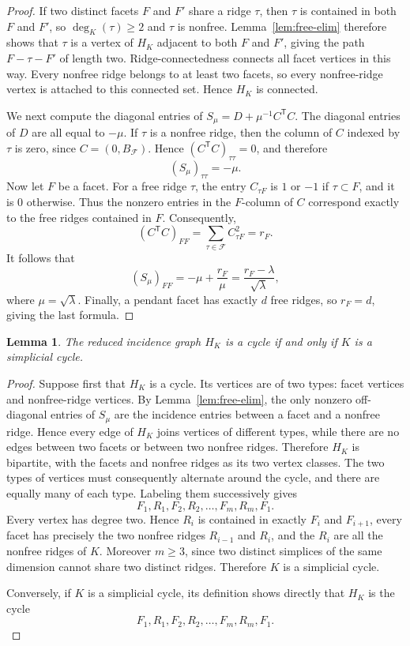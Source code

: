 \documentclass[12pt]{article}
\newtheorem{lemma}{Lemma}
\theoremstyle{remark}
\begin{document}
\begin{proof}
If two distinct facets $F$ and $F'$ share a ridge $\tau$, then $\tau$ is contained in both $F$ and $F'$, so $\deg_K(\tau)\ge2$ and $\tau$ is nonfree.  Lemma~\ref{lem:free-elim} therefore shows that $\tau$ is a vertex of $H_K$ adjacent to both $F$ and $F'$, giving the path $F-\tau-F'$ of length two.  Ridge-connectedness connects all facet vertices in this way.  Every nonfree ridge belongs to at least two facets, so every nonfree-ridge vertex is attached to this connected set.  Hence $H_K$ is connected.

We next compute the diagonal entries of $S_\mu=D+\mu^{-1}C^{\mathsf T}C$.  The diagonal entries of $D$ are all equal to $-\mu$.  If $\tau$ is a nonfree ridge, then the column of $C$ indexed by $\tau$ is zero, since $C=(0,B_{\mathcal F})$.  Hence $(C^{\mathsf T}C)_{\tau\tau}=0$, and therefore
\[
(S_\mu)_{\tau\tau}=-\mu.
\]
Now let $F$ be a facet.  For a free ridge $\tau$, the entry $C_{\tau F}$ is $1$ or $-1$ if $\tau\subset F$, and it is $0$ otherwise.  Thus the nonzero entries in the $F$-column of $C$ correspond exactly to the free ridges contained in $F$.  Consequently,
\[
(C^{\mathsf T}C)_{FF}
=\sum_{\tau\in\mathcal F}C_{\tau F}^2=r_F.
\]
It follows that
\[
(S_\mu)_{FF}=-\mu+\frac{r_F}{\mu}
=\frac{r_F-\lambda}{\sqrt\lambda},
\]
where $\mu=\sqrt\lambda$.  Finally, a pendant facet has exactly $d$ free ridges, so $r_F=d$, giving the last formula.
\end{proof}

\begin{lemma}\label{lem:simplicial-cycle}
The reduced incidence graph $H_K$ is a cycle if and only if $K$ is a simplicial cycle.
\end{lemma}

\begin{proof}
Suppose first that $H_K$ is a cycle.  Its vertices are of two types: facet vertices and nonfree-ridge vertices.  By Lemma~\ref{lem:free-elim}, the only nonzero off-diagonal entries of $S_\mu$ are the incidence entries between a facet and a nonfree ridge.  Hence every edge of $H_K$ joins vertices of different types, while there are no edges between two facets or between two nonfree ridges.  Therefore $H_K$ is bipartite, with the facets and nonfree ridges as its two vertex classes.  The two types of vertices must consequently alternate around the cycle, and there are equally many of each type.  Labeling them successively gives
\[
F_1,R_1,F_2,R_2,\ldots,F_m,R_m,F_1.
\]
Every vertex has degree two.  Hence $R_i$ is contained in exactly $F_i$ and $F_{i+1}$, every facet has precisely the two nonfree ridges $R_{i-1}$ and $R_i$, and the $R_i$ are all the nonfree ridges of $K$.  Moreover $m\ge3$, since two distinct simplices of the same dimension cannot share two distinct ridges.  Therefore $K$ is a simplicial cycle.

Conversely, if $K$ is a simplicial cycle, its definition shows directly that $H_K$ is the cycle
\[
F_1,R_1,F_2,R_2,\ldots,F_m,R_m,F_1.
\]
\end{proof}
\end{document}
